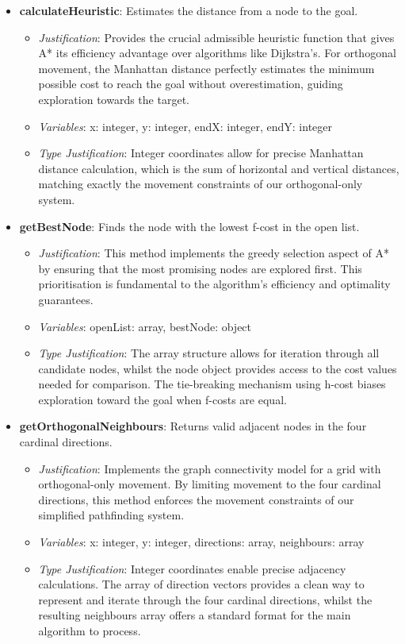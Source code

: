 \begin{itemize}
\item \textbf{calculateHeuristic}: Estimates the distance from a node to the goal. \begin{itemize} \item \textit{Justification}: Provides the crucial admissible heuristic function that gives A* its efficiency advantage over algorithms like Dijkstra's. For orthogonal movement, the Manhattan distance perfectly estimates the minimum possible cost to reach the goal without overestimation, guiding exploration towards the target. \item \textit{Variables}: x: integer, y: integer, endX: integer, endY: integer \item \textit{Type Justification}: Integer coordinates allow for precise Manhattan distance calculation, which is the sum of horizontal and vertical distances, matching exactly the movement constraints of our orthogonal-only system. \end{itemize}

\item \textbf{getBestNode}: Finds the node with the lowest f-cost in the open list. \begin{itemize} \item \textit{Justification}: This method implements the greedy selection aspect of A* by ensuring that the most promising nodes are explored first. This prioritisation is fundamental to the algorithm's efficiency and optimality guarantees. \item \textit{Variables}: openList: array, bestNode: object \item \textit{Type Justification}: The array structure allows for iteration through all candidate nodes, whilst the node object provides access to the cost values needed for comparison. The tie-breaking mechanism using h-cost biases exploration toward the goal when f-costs are equal. \end{itemize}

\item \textbf{getOrthogonalNeighbours}: Returns valid adjacent nodes in the four cardinal directions. \begin{itemize} \item \textit{Justification}: Implements the graph connectivity model for a grid with orthogonal-only movement. By limiting movement to the four cardinal directions, this method enforces the movement constraints of our simplified pathfinding system. \item \textit{Variables}: x: integer, y: integer, directions: array, neighbours: array \item \textit{Type Justification}: Integer coordinates enable precise adjacency calculations. The array of direction vectors provides a clean way to represent and iterate through the four cardinal directions, whilst the resulting neighbours array offers a standard format for the main algorithm to process. \end{itemize}


\end{itemize}
